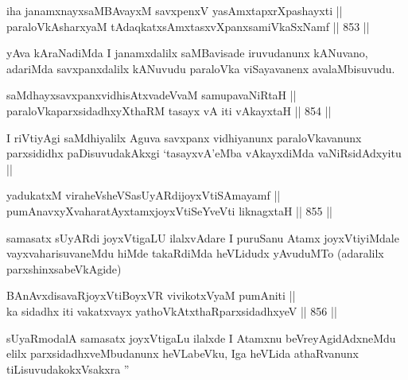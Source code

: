 \begin{shl}
iha janamxnayxsaMBAvayxM savxpenxV yasAmxtapxrXpashayxti ||  \\
paraloVkAsharxyaM tAdaqkatxsAmxtasxvXpanxsamiVkaSxNamf ||  853 ||  
\end{shl}

\begin{artha}
yAva kAraNadiMda I janamxdalilx saMBavisade iruvudanunx kANuvano, adariMda savxpanxdalilx kANuvudu paraloVka viSayavanenx avalaMbisuvudu.
\end{artha}


\begin{shl}
saMdhayxsavxpanxvidhisAtxvadeVvaM samupavaNiRtaH ||  \\
paraloVkaparxsidadhxyXthaRM tasayx vA iti vAkayxtaH ||  854 ||  
\end{shl}

\begin{artha}
I riVtiyAgi saMdhiyalilx Aguva savxpanx vidhiyanunx paraloVkavanunx parxsididhx paDisuvudakAkxgi `tasayxvA'eMba vAkayxdiMda vaNiRsidAdxyitu ||
\end{artha}

\begin{shl}
yadukatxM viraheV\s sheVSasUyARdijoyxVtiSAmayamf || \\
pumAnavxyXvaharatAyxtamxjoyxVtiSeYveVti liknagxtaH ||  855 ||  
\end{shl}

\begin{artha}
samasatx sUyARdi joyxVtigaLU ilalxvAdare I puruSanu Atamx joyxVtiyiMdale vayxvaharisuvaneMdu hiMde takaRdiMda heVLidudx yAvuduMTo (adaralilx parxshinxsabeVkAgide) 
\end{artha}

\begin{shl}
BAnAvxdisavaRjoyxVtiBoyxVR vivikotxV\s yaM pumAniti || \\
ka sidadhx iti vakatxvayx yathoVkAtxthaRparxsidadhxyeV ||  856 ||  
\end{shl}

\begin{artha}
sUyaRmodalA samasatx joyxVtigaLu ilalxde I Atamxnu beVreyAgidAdxneMdu elilx parxsidadhxveMbudanunx heVLabeVku, Iga heVLida athaRvanunx tiLisuvudakokxVsakxra \stext''
\end{artha}


